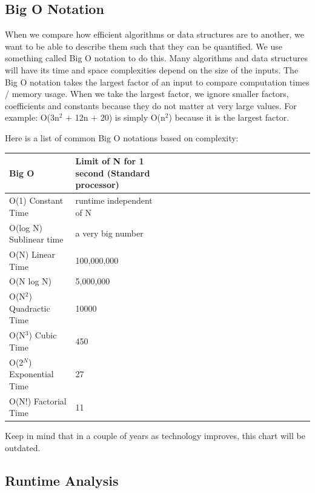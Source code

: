 \documentclass[11pt,oneside]{book}
\begin{document}
\subsection{Big O Notation}

When we compare how efficient algorithms or data structures are to another, we want to be able to describe them such that they can be quantified. We use something called Big O notation to do this. Many algorithms and data structures will have its time and space complexities depend on the size of the inputs. The Big O notation takes the largest factor of an input to compare computation times / memory usage. When we take the largest factor, we ignore smaller factors, coefficients and constants because they do not matter at very large values. For example: O(3n$^{2}$ + 12n + 20) is simply O(n$^{2}$) because it is the largest factor.

Here is a list of common Big O notations based on complexity:

\vspace{10px}\begin{tabulary}{0.4\linewidth}{|l|l|l|l|l|l|l|l|l|l|l|l|l|l|l|l|l|l|l}\hline


  Big O &
  Limit of N for 1 second (Standard processor)\\
\hline


  O(1) Constant Time &
  runtime independent of N\\

  O(log N) Sublinear time &
  a very big number\\

  O(N) Linear Time &
  100,000,000\\

  O(N log N) &
  5,000,000\\

  O(N$^{2}$) Quadractic Time &
  10000\\

  O(N$^{3}$) Cubic Time &
  450\\

  O(2$^{N}$) Exponential Time &
  27\\

  O(N!) Factorial Time &
  11\\

\hline\end{tabulary}

Keep in mind that in a couple of years as technology improves, this chart will be outdated.

\subsection{Runtime Analysis}
\end{document}
